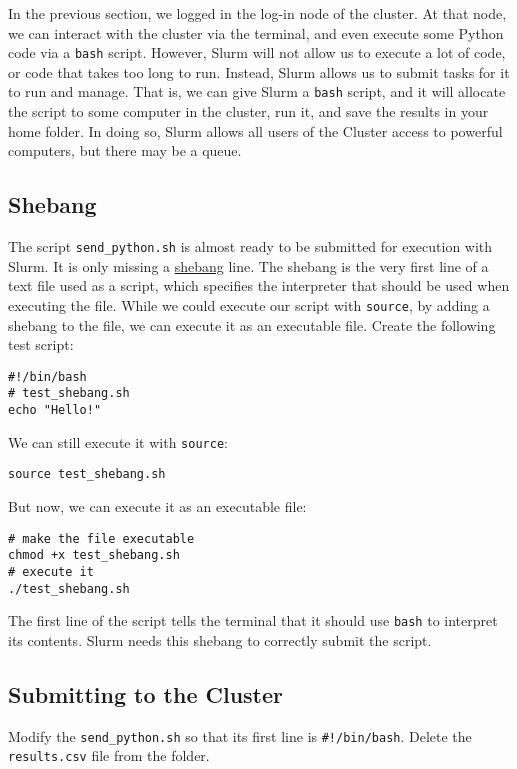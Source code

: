 \documentclass[12pt, a4paper]{article}
\begin{document}
In the previous section, we logged in the log-in node of the cluster.
At that node, we can interact with the cluster via the terminal, and even execute some Python code via a \texttt{bash} script.
However, Slurm will not allow us to execute a lot of code, or code that takes too long to run.
Instead, Slurm allows us to submit tasks for it to run and manage.
That is, we can give Slurm a \texttt{bash} script, and it will allocate the script to some computer in the cluster, run it, and save the results in your home folder.
In doing so, Slurm allows all users of the Cluster access to powerful computers, but there may be a queue.
\subsection{Shebang}
\label{sec:org2cb9b2b}
The script \texttt{send\_python.sh} is almost ready to be submitted for execution with Slurm.
It is only missing a \href{https://en.wikipedia.org/wiki/Shebang\_(Unix)}{shebang} line.
The shebang is the very first line of a text file used as a script, which specifies the interpreter that should be used when executing the file.
While we could execute our script with \texttt{source}, by adding a shebang to the file, we can execute it as an executable file.
Create the following test script:
\lstset{language=bash,label= ,caption= ,captionpos=b,firstnumber=1,numbers=left,style=bash}
\begin{lstlisting}
#!/bin/bash
# test_shebang.sh
echo "Hello!"
\end{lstlisting}
We can still execute it with \texttt{source}:
\lstset{language=bash,label= ,caption= ,captionpos=b,firstnumber=1,numbers=left,style=bash}
\begin{lstlisting}
source test_shebang.sh
\end{lstlisting}
But now, we can execute it as an executable file:
\lstset{language=bash,label= ,caption= ,captionpos=b,firstnumber=1,numbers=left,style=bash}
\begin{lstlisting}
# make the file executable
chmod +x test_shebang.sh
# execute it
./test_shebang.sh
\end{lstlisting}
The first line of the script tells the terminal that it should use \texttt{bash} to interpret its contents.
Slurm needs this shebang to correctly submit the script.
\subsection{Submitting to the Cluster}
\label{sec:org9de0f74}
Modify the \texttt{send\_python.sh} so that its first line is \texttt{\#!/bin/bash}.
Delete the \texttt{results.csv} file from the folder.
\end{document}
